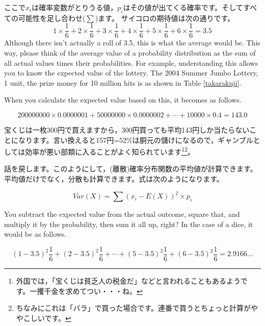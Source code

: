ここで$x_i$は確率変数がとりうる値，$p_i$はその値が出てくる確率です。そしてすべての可能性を足し合わせ($\sum$)ます。
サイコロの期待値は次の通りです。
\[1\times\frac{1}{6}+
	2\times\frac{1}{6}+
	3\times\frac{1}{6}+
	4\times\frac{1}{6}+
	5\times\frac{1}{6}+
	6\times\frac{1}{6}
	=3.5\]
Although there isn't actually a roll of 3.5, this is what the average would be. This way, please think of the average value of a probability distribution as the sum of all actual values times their probabilities.
For example, understanding this allows you to know the expected value of the lottery. The 2004 Summer Jumbo Lottery, 1 unit, the prize money for 10 million hits is as shown in Table \ref{takarakuji}.



When you calculate the expected value based on this, it becomes as follows.

\[200000000 \times 0.0000001 + 50000000 \times 0.0000002 + \cdots + 10000\times0.4=143.0 \]

宝くじは一枚300円で買えますから，300円買っても平均143円しか当たらないことになります。言い換えると157円=$52\%$は胴元の儲けになるので，ギャンブルとしては効率が悪い部類に入ることがよく知られています\footnote{外国では，「宝くじは貧乏人の税金だ」などと言われることもあるようです。一攫千金を求めてつい・・・ね。}\footnote{ちなみにこれは「バラ」で買った場合です。連番で買うとちょっと計算がややこしいです。}。

話を戻します。このようにして，(離散)確率分布関数の平均値が計算できます。平均値だけでなく，分散も計算できます。式は次のようになります。

\[ Var(X) = \sum (x_i-E(X))^2 \times p_i \]

You subtract the expected value from the actual outcome, square that, and multiply it by the probability, then sum it all up, right? In the case of a dice, it would be as follows.

\[
	(1-3.5)^2\frac{1}{6}+
	(2-3.5)^2\frac{1}{6}+
	\cdots+
	(5-3.5)^2\frac{1}{6}+
	(6-3.5)^2\frac{1}{6} = 2.9166...
\]

